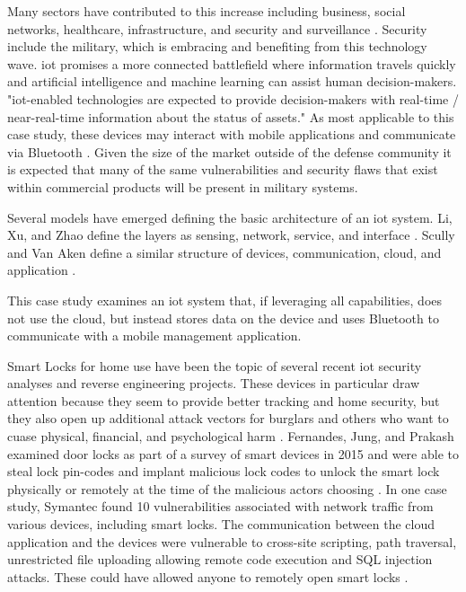 \documentclass[journal]{IEEEtran}
\begin{document}
\bigskip

Many sectors have contributed to this increase including business, social networks, healthcare, infrastructure, and security and surveillance \cite{Li2015}. Security include the military, which is embracing and benefiting from this technology wave. \gls{iot} promises a more connected battlefield where information travels quickly and artificial intelligence and machine learning can assist human decision-makers. "\gls{iot}-enabled technologies are expected to provide decision-makers with real-time / near-real-time information about the status of assets." As most applicable to this case study, these devices may interact with mobile applications and communicate via Bluetooth \cite{Miller}. Given the size of the market outside of the defense community it is expected that many of the same vulnerabilities and security flaws that exist within commercial products will be present in military systems. 

\bigskip

Several models have emerged defining the basic architecture of an \gls{iot} system. Li, Xu, and Zhao define the layers as sensing, network, service, and interface \cite{Li2015}. Scully and Van Aken define a similar structure of devices, communication, cloud, and application \cite{Scully 2017}.  

\bigskip

This case study examines an \gls{iot} system that, if leveraging all capabilities, does not use the cloud, but instead stores data on the device and uses Bluetooth to communicate with a mobile management application.

\bigskip

Smart Locks for home use have been the topic of several recent \gls{iot} security analyses and reverse engineering projects. These devices in particular draw attention because they seem to provide better tracking and home security, but they also open up additional attack vectors for burglars and others who want to cuase physical, financial, and psychological harm \cite{Fernandes2016}. Fernandes, Jung, and Prakash examined door locks as part of a survey of smart devices in 2015 and were able to steal lock pin-codes and implant malicious lock codes to unlock the smart lock physically or remotely at the time of the malicious actors choosing \cite{Fernandes2016}. In one case study, Symantec found 10 vulnerabilities associated with network traffic from various devices, including smart locks. The communication between the cloud application and the devices were vulnerable to cross-site scripting, path traversal, unrestricted file uploading allowing remote code execution and SQL injection attacks. These could have allowed anyone to remotely open smart locks \cite{Barcena2015}.
\end{document}
